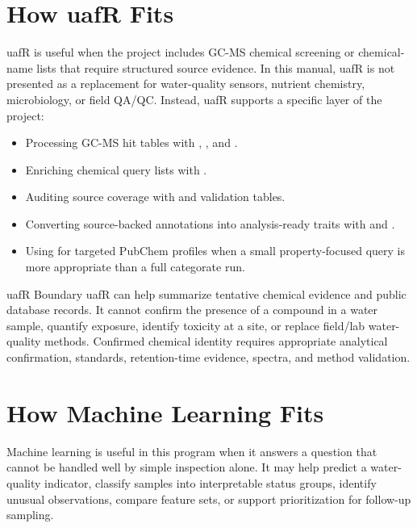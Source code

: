 \section{How uafR Fits}

uafR is useful when the project includes GC-MS chemical screening or chemical-name lists that require structured source evidence. In this manual, uafR is not presented as a replacement for water-quality sensors, nutrient chemistry, microbiology, or field QA/QC. Instead, uafR supports a specific layer of the project:
\begin{itemize}
  \item Processing GC-MS hit tables with , , and .
  \item Enriching chemical query lists with .
  \item Auditing source coverage with  and validation tables.
  \item Converting source-backed annotations into analysis-ready traits with  and .
  \item Using  for targeted PubChem profiles when a small property-focused query is more appropriate than a full categorate run.
\end{itemize}

\begin{cautionbox}{uafR Boundary}
uafR can help summarize tentative chemical evidence and public database records. It cannot confirm the presence of a compound in a water sample, quantify exposure, identify toxicity at a site, or replace field/lab water-quality methods. Confirmed chemical identity requires appropriate analytical confirmation, standards, retention-time evidence, spectra, and method validation.
\end{cautionbox}

\section{How Machine Learning Fits}

Machine learning is useful in this program when it answers a question that cannot be handled well by simple inspection alone. It may help predict a water-quality indicator, classify samples into interpretable status groups, identify unusual observations, compare feature sets, or support prioritization for follow-up sampling.

